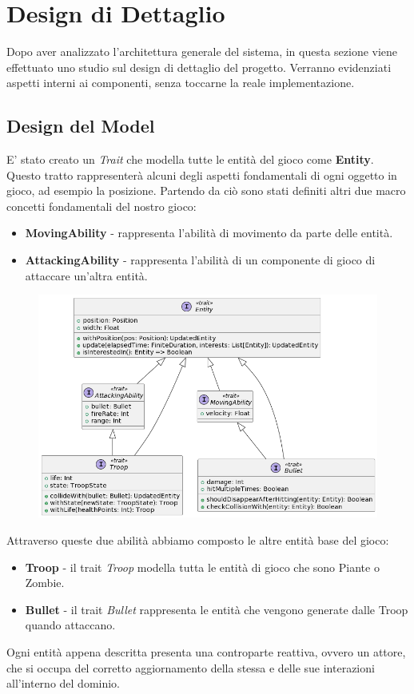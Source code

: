 \section{Design di Dettaglio}
Dopo aver analizzato l'architettura generale del sistema, in questa sezione viene effettuato uno studio sul design
di dettaglio del progetto.
Verranno evidenziati aspetti interni ai componenti, senza toccarne la reale implementazione.

\subsection{Design del Model}
E' stato creato un \textit{Trait} che modella tutte le entità del gioco come \textbf{Entity}. Questo tratto rappresenterà
alcuni degli aspetti fondamentali di ogni oggetto in gioco, ad esempio la posizione. Partendo da ciò sono stati definiti
altri due macro concetti fondamentali del nostro gioco:
\begin{itemize}
    \item \textbf{MovingAbility} - rappresenta l'abilità di movimento da parte delle entità.
    \item \textbf{AttackingAbility} - rappresenta l'abilità di un componente di gioco di attaccare un'altra entità.
\end{itemize}
\begin{figure}[H]
    \centering
    \includegraphics[width=\linewidth]{images/model-desing}
    \label{Diagramma delle classi della gerarchia delle entità di gioco.}
\end{figure}
Attraverso queste due abilità abbiamo composto le altre entità base del gioco:
\begin{itemize}
    \item \textbf{Troop} - il trait \textit{Troop} modella tutta le entità di gioco che sono Piante o Zombie.
    \item \textbf{Bullet} - il trait \textit{Bullet} rappresenta le entità che vengono generate dalle Troop quando
    attaccano.
\end{itemize}
Ogni entità appena descritta presenta una controparte
reattiva, ovvero un attore, che si occupa del corretto aggiornamento della stessa e delle sue
interazioni all’interno del dominio.

